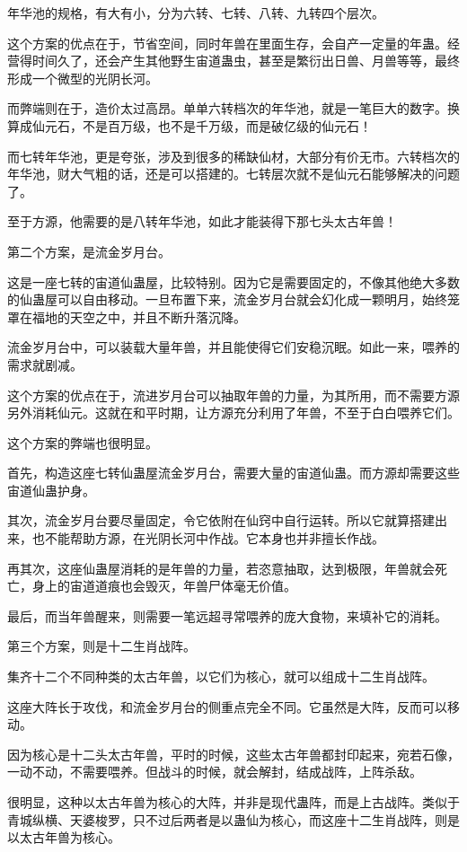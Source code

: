 \begin{this_body}
年华池的规格，有大有小，分为六转、七转、八转、九转四个层次。

这个方案的优点在于，节省空间，同时年兽在里面生存，会自产一定量的年蛊。经营得时间久了，还会产生其他野生宙道蛊虫，甚至是繁衍出日兽、月兽等等，最终形成一个微型的光阴长河。

而弊端则在于，造价太过高昂。单单六转档次的年华池，就是一笔巨大的数字。换算成仙元石，不是百万级，也不是千万级，而是破亿级的仙元石！

而七转年华池，更是夸张，涉及到很多的稀缺仙材，大部分有价无市。六转档次的年华池，财大气粗的话，还是可以搭建的。七转层次就不是仙元石能够解决的问题了。

至于方源，他需要的是八转年华池，如此才能装得下那七头太古年兽！

第二个方案，是流金岁月台。

这是一座七转的宙道仙蛊屋，比较特别。因为它是需要固定的，不像其他绝大多数的仙蛊屋可以自由移动。一旦布置下来，流金岁月台就会幻化成一颗明月，始终笼罩在福地的天空之中，并且不断升落沉降。

流金岁月台中，可以装载大量年兽，并且能使得它们安稳沉眠。如此一来，喂养的需求就剧减。

这个方案的优点在于，流进岁月台可以抽取年兽的力量，为其所用，而不需要方源另外消耗仙元。这就在和平时期，让方源充分利用了年兽，不至于白白喂养它们。

这个方案的弊端也很明显。

首先，构造这座七转仙蛊屋流金岁月台，需要大量的宙道仙蛊。而方源却需要这些宙道仙蛊护身。

其次，流金岁月台要尽量固定，令它依附在仙窍中自行运转。所以它就算搭建出来，也不能帮助方源，在光阴长河中作战。它本身也并非擅长作战。

再其次，这座仙蛊屋消耗的是年兽的力量，若恣意抽取，达到极限，年兽就会死亡，身上的宙道道痕也会毁灭，年兽尸体毫无价值。

最后，而当年兽醒来，则需要一笔远超寻常喂养的庞大食物，来填补它的消耗。

第三个方案，则是十二生肖战阵。

集齐十二个不同种类的太古年兽，以它们为核心，就可以组成十二生肖战阵。

这座大阵长于攻伐，和流金岁月台的侧重点完全不同。它虽然是大阵，反而可以移动。

因为核心是十二头太古年兽，平时的时候，这些太古年兽都封印起来，宛若石像，一动不动，不需要喂养。但战斗的时候，就会解封，结成战阵，上阵杀敌。

很明显，这种以太古年兽为核心的大阵，并非是现代蛊阵，而是上古战阵。类似于青城纵横、天婆梭罗，只不过后两者是以蛊仙为核心，而这座十二生肖战阵，则是以太古年兽为核心。


\end{this_body}
